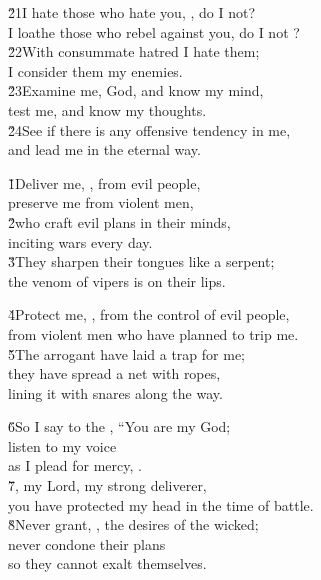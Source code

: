 \begin{poetry}
\poeml \v{21}I hate those who hate you, , do I not? \\
\poemll    I loathe those who rebel against you, do I not ? \\
\poeml \v{22}With consummate hatred I hate them; \\
\poemll    I consider them my enemies. \\
\poeml \v{23}Examine me, God, and know my mind, \\
\poemll    test me, and know my thoughts. \\
\poeml \v{24}See if there is any offensive tendency in me, \\
\poemll    and lead me in the eternal way.
\end{poetry}

\begin{poetry}
\poeml \v{1}Deliver me, , from evil people, \\
\poemll    preserve me from violent men, \\
\poeml \v{2}who craft evil plans in their minds, \\
\poemll    inciting wars every day. \\
\poeml \v{3}They sharpen their tongues like a serpent; \\
\poemll    the venom of vipers is on their lips.
\end{poetry}

\begin{poetry}
\poeml \v{4}Protect me, , from the control of evil people, \\
\poemll    from violent men who have planned to trip me. \\
\poeml \v{5}The arrogant have laid a trap for me; \\
\poemll    they have spread a net with ropes, \\
\poemlll       lining it with snares along the way.
\end{poetry}

\begin{poetry}
\poeml \v{6}So I say to the , ``You are my God; \\
\poemll    listen to my voice \\
\poemlll       as I plead for mercy, . \\
\poeml \v{7}, my Lord, my strong deliverer, \\
\poemll    you have protected my head in the time of battle. \\
\poeml \v{8}Never grant, , the desires of the wicked; \\
\poemll    never condone their plans \\
\poemlll       so they cannot exalt themselves.
\end{poetry}

